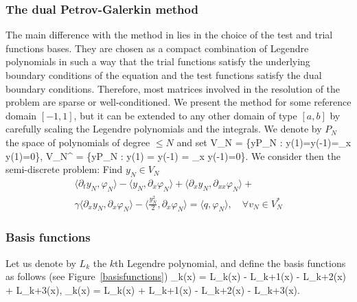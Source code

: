 \subsubsection{The dual Petrov-Galerkin method}
The main difference with the method in \cite{ma2000legendre} lies in the choice of the test and trial functions bases. They are chosen as a compact combination of Legendre polynomials in such a way that the trial functions satisfy the underlying boundary conditions of the equation and the test functions satisfy the dual boundary conditions. Therefore, most matrices involved in the resolution of the problem are sparse or well-conditioned. We present the method for some reference domain $[-1,1]$, but it can be extended to any other domain of type $[a,b]$ by carefully scaling the Legendre polynomials and the integrals. We denote by $P_N$ the space of polynomials of degree $\leq N$ and set
\be
V_N = \left\{y\in P_N : y(1)=y(-1)=\partial_x y(1)=0\right\},
\ee
\be
V_N^{\ast} = \left\{y\in P_N : y(1) = y(-1) = \partial_x y(-1)=0\right\}.
\ee
We consider then the semi-discrete problem:
Find $y_N \in V_N$
\begin{multline}
\langle\partial_t y_N, \varphi_N\rangle - \langle y_N, \partial_x \varphi_N \rangle + \langle\partial_x y_N, \partial_{xx}\varphi_N \rangle  + \\ \gamma \langle \partial_x y_N, \partial_x \varphi_N \rangle- \langle\frac{y_N^2}{2}, \partial_x \varphi_N\rangle= \langle q, \varphi_N\rangle, \quad \forall v_N \in V_N^{\ast}
\label{petrovgalerkin}
\end{multline}

\subsubsection{Basis functions}
Let us denote by $L_k$ the $k$th Legendre polynomial, and define the basis functions as follows (see Figure~\ref{basisfunctions})
\be
\phi_k(x) = L_k(x) - L_{k+1}(x) - L_{k+2}(x) + L_{k+3}(x),
\ee
\be
\psi_k(x) = L_k(x) + L_{k+1}(x) - L_{k+2}(x) - L_{k+3}(x).
\ee



